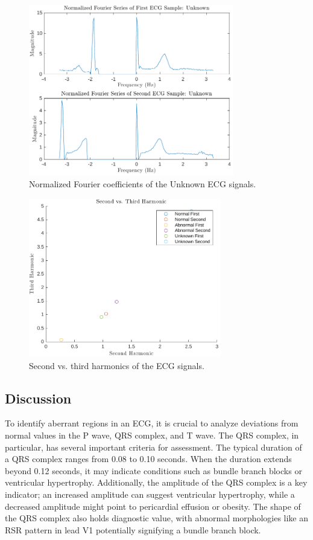 \documentclass{zc-ust-hw}
\begin{document}
\begin{figure}[H]
  \centering
  \includegraphics[width=0.8\textwidth]{figures/Fourier_Unknown.pdf}
  \caption{Normalized Fourier coefficients of the Unknown ECG signals.}
\end{figure}

\begin{figure}[H]
  \centering
  \includegraphics[width=0.75\textwidth]{figures/Second_vs_Third_Harmonic.pdf}
  \caption{Second vs. third harmonics of the ECG signals.}
\end{figure}

\subsection{Discussion}

To identify aberrant regions in an ECG, it is crucial to analyze deviations
from normal values in the P wave, QRS complex, and T wave. The QRS complex, in
particular, has several important criteria for assessment. The typical duration
of a QRS complex ranges from 0.08 to 0.10 seconds. When the duration extends
beyond 0.12 seconds, it may indicate conditions such as bundle branch blocks or
ventricular hypertrophy. Additionally, the amplitude of the QRS complex is a
key indicator; an increased amplitude can suggest ventricular hypertrophy,
while a decreased amplitude might point to pericardial effusion or obesity. The
shape of the QRS complex also holds diagnostic value, with abnormal
morphologies like an RSR pattern in lead V1 potentially signifying a bundle
branch block.
\end{document}
